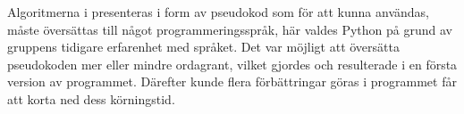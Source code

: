
Algoritmerna i \cite{HaraldSieve} presenteras i form av pseudokod som för att kunna användas, måste översättas till något programmeringsspråk, här valdes Python på grund av gruppens tidigare erfarenhet med språket. Det var möjligt att översätta pseudokoden mer eller mindre ordagrant, vilket gjordes och resulterade i en första version av programmet. Därefter kunde flera förbättringar göras i programmet får att korta ned dess körningstid. 


